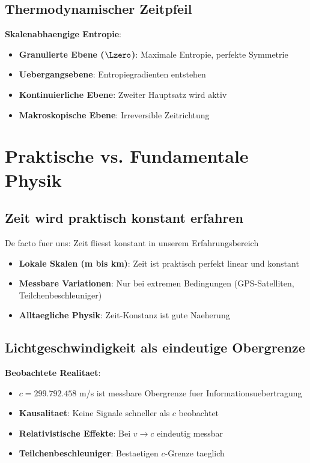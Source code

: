 	\subsection{Thermodynamischer Zeitpfeil}
	
	\textbf{Skalenabhaengige Entropie}:
	\begin{itemize}
		\item \textbf{Granulierte Ebene ($\Lzero$)}: Maximale Entropie, perfekte Symmetrie
		\item \textbf{Uebergangsebene}: Entropiegradienten entstehen
		\item \textbf{Kontinuierliche Ebene}: Zweiter Hauptsatz wird aktiv
		\item \textbf{Makroskopische Ebene}: Irreversible Zeitrichtung
	\end{itemize}
	
	\section{Praktische vs. Fundamentale Physik}
	
	\subsection{Zeit wird praktisch konstant erfahren}
	
	De facto fuer uns: Zeit fliesst konstant in unserem Erfahrungsbereich
	\begin{itemize}
		\item \textbf{Lokale Skalen (m bis km)}: Zeit ist praktisch perfekt linear und konstant
		\item \textbf{Messbare Variationen}: Nur bei extremen Bedingungen (GPS-Satelliten, Teilchenbeschleuniger)
		\item \textbf{Alltaegliche Physik}: Zeit-Konstanz ist gute Naeherung
	\end{itemize}
	
	\subsection{Lichtgeschwindigkeit als eindeutige Obergrenze}
	
	\textbf{Beobachtete Realitaet}:
	\begin{itemize}
		\item $c = 299.792.458$ m/s ist messbare Obergrenze fuer Informationsuebertragung
		\item \textbf{Kausalitaet}: Keine Signale schneller als $c$ beobachtet
		\item \textbf{Relativistische Effekte}: Bei $v \rightarrow c$ eindeutig messbar
		\item \textbf{Teilchenbeschleuniger}: Bestaetigen $c$-Grenze taeglich
	\end{itemize}
	
